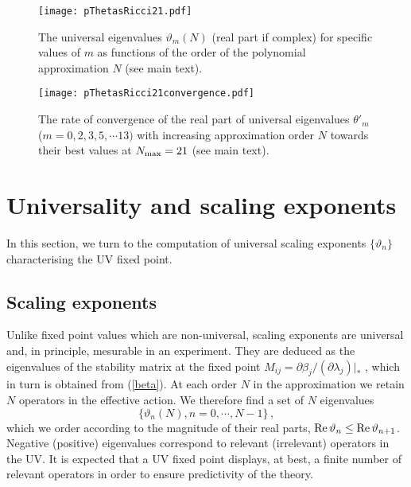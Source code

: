 \documentclass[notitlepage,eqsecnum,bm,amsmath,preprintnumbers,superscriptaddress,nofootinbib,aps,11pt]{revtex4-1}
\def\eq#1{(\ref{#1})}
\def\beq{\begin{equation}}
\def\eeq{\end{equation}}
\begin{document}
 
 
 

\begin{figure}[t]
\centering
\begin{center}
\texttt{[image: pThetasRicci21.pdf]}
\caption{\label{pThetas} The universal eigenvalues $\vartheta_m(N)$ (real part if complex) for specific values of $m$ as functions of the order of the polynomial approximation $N$ (see main text).}
\end{center}
\end{figure}

\begin{figure}[t]
\centering
\begin{center}
\texttt{[image: pThetasRicci21convergence.pdf]}
\caption{\label{pThetaConvergence} The rate of convergence of the real part of universal eigenvalues $\theta'_m$ ($m=0,2,3,5,\cdots 13)$
with increasing approximation order $N$ towards their best values at $N_{\rm max}=21 $ (see main text).}
\end{center}
\end{figure}





\section{\bf Universality and scaling exponents}\label{scaling}
In this section, we turn to the computation of universal scaling exponents $\{\vartheta_n\}$ characterising the UV fixed point. 

\subsection{Scaling exponents}

Unlike fixed point values which are non-universal, scaling exponents are universal and, in principle, mesurable in an experiment. They are deduced as the eigenvalues of the stability matrix at the fixed point $M_{ij}=\partial\beta_j/(\partial\lambda_j)|_*$ , which in turn is obtained from \eq{beta}. At each order $N$ in the approximation we retain $N$ operators in the effective action. We therefore find a set of $N$ eigenvalues 
\beq\label{thetas}
\{\vartheta_n(N), n=0,\cdots,N-1\}\,,
\eeq
which we order according to the magnitude of their real parts, ${\rm Re}\,\vartheta_n\le {\rm Re}\,\vartheta_{n+1}$. Negative (positive) eigenvalues correspond to relevant (irrelevant) operators in the UV. It is expected that a UV fixed point displays, at best, a finite number of relevant operators in order to ensure predictivity of the theory.
\end{document}
